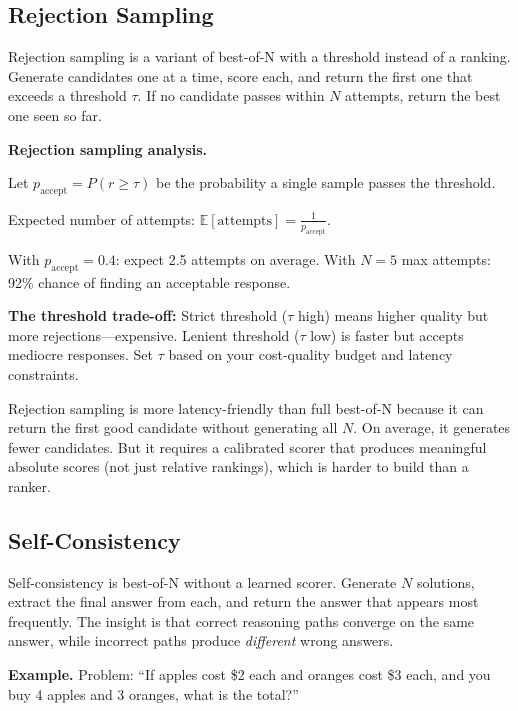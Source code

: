 \begin{chapterenv}
\subsection{Rejection Sampling}

Rejection sampling is a variant of best-of-N with a threshold instead of a ranking. Generate candidates one at a time, score each, and return the first one that exceeds a threshold $\tau$. If no candidate passes within $N$ attempts, return the best one seen so far.

\begin{infobox}
\textbf{Rejection sampling analysis.}

Let $p_{\text{accept}} = P(r \geq \tau)$ be the probability a single sample passes the threshold.

Expected number of attempts: $\mathbb{E}[\text{attempts}] = \frac{1}{p_{\text{accept}}}$.

With $p_{\text{accept}} = 0.4$: expect 2.5 attempts on average. With $N = 5$ max attempts: 92\% chance of finding an acceptable response.

\textbf{The threshold trade-off:} Strict threshold ($\tau$ high) means higher quality but more rejections---expensive. Lenient threshold ($\tau$ low) is faster but accepts mediocre responses. Set $\tau$ based on your cost-quality budget and latency constraints.
\end{infobox}

Rejection sampling is more latency-friendly than full best-of-N because it can return the first good candidate without generating all $N$. On average, it generates fewer candidates. But it requires a calibrated scorer that produces meaningful absolute scores (not just relative rankings), which is harder to build than a ranker.

\subsection{Self-Consistency}

Self-consistency is best-of-N without a learned scorer. Generate $N$ solutions, extract the final answer from each, and return the answer that appears most frequently. The insight is that correct reasoning paths converge on the same answer, while incorrect paths produce \textit{different} wrong answers.

\textbf{Example.} Problem: ``If apples cost \$2 each and oranges cost \$3 each, and you buy 4 apples and 3 oranges, what is the total?''


\end{chapterenv}
